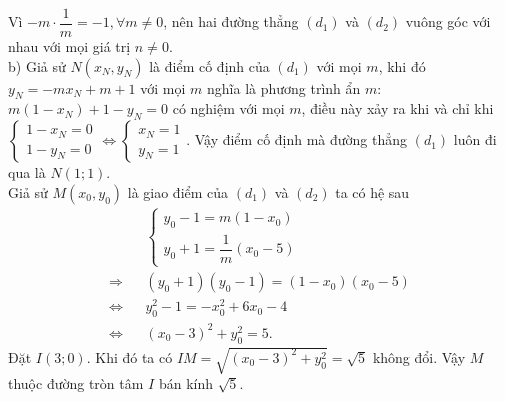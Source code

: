 \begin{ex}
{\begin{enumerate}[1)]
		Vì $ -m\cdot\dfrac{1}{m} = -1, \forall m \ne 0 $, nên hai đường thẳng $ (d_1) $ và $ (d_2) $ vuông góc với nhau với mọi giá trị $ n\ne 0 $.\\
		b) Giả sử $ N(x_N,y_N) $ là điểm cố định của $ (d_1) $ với mọi $ m $, khi đó $ y_N = -mx_N + m + 1 $ với mọi $ m $ nghĩa là phương trình ẩn $ m $: $ m(1-x_N) + 1-y_N = 0 $ có nghiệm với mọi $ m $, điều này xảy ra khi và chỉ khi $ \begin{cases}
		1-x_N = 0\\ 1-y_N = 0
		\end{cases} \Leftrightarrow \begin{cases}
		x_N = 1\\
		y_N = 1
		\end{cases} $. Vậy điểm cố định mà đường thẳng $ (d_1) $ luôn đi qua là $ N(1;1) $.\\
		Giả sử $ M(x_0,y_0) $ là giao điểm của $ (d_1) $ và $ (d_2) $ ta có hệ sau\\
		\begin{eqnarray*}
		&&\begin{cases}
		y_0 - 1 = m(1-x_0)\\
		y_0 + 1 = \dfrac{1}{m}(x_0-5)
		\end{cases}\\
		\Rightarrow&& (y_0+1)(y_0-1) = (1-x_0)(x_0-5) \\
		\Leftrightarrow &&y_0^2 - 1 = -x_0^2 + 6x_0 - 4\\
		\Leftrightarrow && (x_0-3)^2 + y_0^2 = 5.
		\end{eqnarray*}
		Đặt $ I(3;0) $. Khi đó ta có $ IM = \sqrt{(x_0-3)^2 + y_0^2} = \sqrt{5} $ không đổi. Vậy $ M $ thuộc đường tròn tâm $ I $ bán kính $ \sqrt{5} $.
	\end{enumerate}
}
\end{ex}
